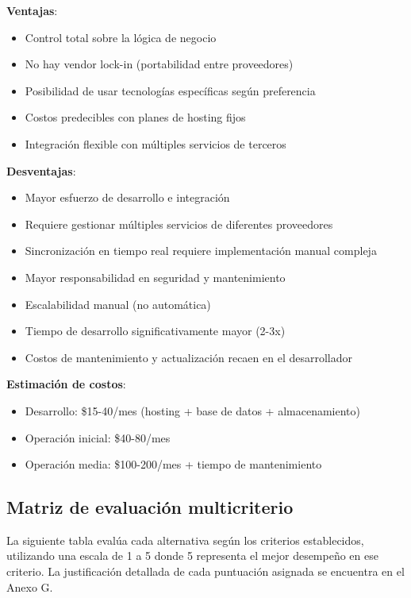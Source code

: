 \textbf{Ventajas}:
\begin{itemize}
    \item Control total sobre la lógica de negocio
    \item No hay vendor lock-in (portabilidad entre proveedores)
    \item Posibilidad de usar tecnologías específicas según preferencia
    \item Costos predecibles con planes de hosting fijos
    \item Integración flexible con múltiples servicios de terceros
\end{itemize}

\textbf{Desventajas}:
\begin{itemize}
    \item Mayor esfuerzo de desarrollo e integración
    \item Requiere gestionar múltiples servicios de diferentes proveedores
    \item Sincronización en tiempo real requiere implementación manual compleja
    \item Mayor responsabilidad en seguridad y mantenimiento
    \item Escalabilidad manual (no automática)
    \item Tiempo de desarrollo significativamente mayor (2-3x)
    \item Costos de mantenimiento y actualización recaen en el desarrollador
\end{itemize}

\textbf{Estimación de costos}:
\begin{itemize}
    \item Desarrollo: \$15-40/mes (hosting + base de datos + almacenamiento)
    \item Operación inicial: \$40-80/mes
    \item Operación media: \$100-200/mes + tiempo de mantenimiento
\end{itemize}

\subsection{Matriz de evaluación multicriterio}

La siguiente tabla evalúa cada alternativa según los criterios establecidos, utilizando una escala de 1 a 5 donde 5 representa el mejor desempeño en ese criterio. La justificación detallada de cada puntuación asignada se encuentra en el Anexo G.

